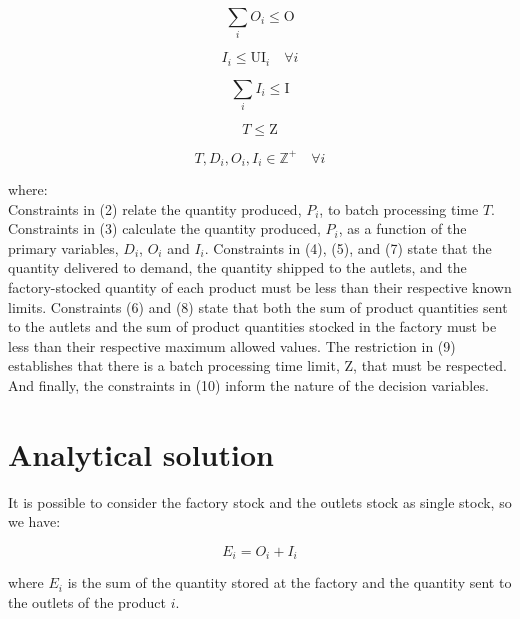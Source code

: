 \documentclass[authoryear,preprint,12pt]{elsarticle}
\begin{document}
\begin{equation}
\sum_i{O_i} \leq \textrm{O}
\end{equation}

\begin{equation}
I_i \leq \textrm{UI}_i \quad \forall i
\end{equation}

\begin{equation}
\sum_i{I_i} \leq \textrm{I}
\end{equation}

\begin{equation}
T \leq \textrm{Z}
\end{equation}

\begin{equation}
T, D_i, O_i, I_i \in  \mathbb{Z}^+ \quad \forall i
\end{equation}

where: \\

Constraints in (2) relate the quantity produced, $P_i$, to batch processing time $T$. Constraints in (3) calculate the quantity produced, $P_i$, as a function of the primary variables, $D_i$, $O_i$ and $I_i$. Constraints in (4), (5), and (7) state that the quantity delivered to demand, the quantity shipped to the autlets, and the factory-stocked quantity of each product must be less than their respective known limits. Constraints (6) and (8) state that both the sum of product quantities sent to the autlets and the sum of product quantities stocked in the factory must be less than their respective maximum allowed values. The restriction in (9) establishes that there is a batch processing time limit, $\textrm{Z}$, that must be respected. And finally, the constraints in (10) inform the nature of the decision variables.

\section{Analytical solution}
\label{sec:analyticalSol}

It is possible to consider the factory stock and the outlets stock as single stock, so we have:

\begin{equation}
E_i = O_i + I_i
\end{equation}

where $E_i$ is the sum of the quantity stored at the factory and the quantity sent to the outlets of the product $i$. \\
\end{document}
